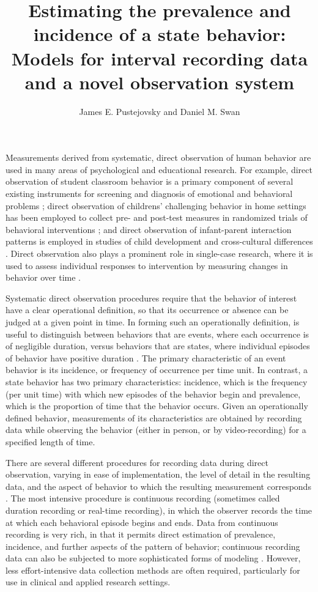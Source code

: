 \documentclass[man, noextraspace, floatsintext]{apa6}\usepackage[]{graphicx}\usepackage[]{color}
\title{Estimating the prevalence and incidence of a state behavior: Models for interval recording data and a novel observation system}
\author{James E. Pustejovsky and Daniel M. Swan}
\affiliation{The University of Texas at Austin}
\begin{document}
\maketitle

Measurements derived from systematic, direct observation of human behavior are used in many areas of psychological and educational research. 
For example, direct observation of student classroom behavior is a primary component of several existing instruments for screening and diagnosis of emotional and behavioral problems \citep{Volpe2005observing}; direct observation of childrens' challenging behavior in home settings has been employed to collect pre- and post-test measures in randomized trials of behavioral interventions \citep[e.g.,][]{Durand2012positive}; and direct observation of infant-parent interaction patterns is employed in studies of child development \citep{Mann1991time} and cross-cultural differences \citep{Bornstein2002measurement}. 
Direct observation also plays a prominent role in single-case research, where it is used to assess individual responses to intervention by measuring changes in behavior over time \citep{Kazdin2011single}.

Systematic direct observation procedures require that the behavior of interest have a clear operational definition, so that its occurrence or absence can be judged at a given point in time. 
In forming such an operationally definition, is useful to distinguish between behaviors that are events, where each occurrence is of negligible duration, versus behaviors that are states, where individual episodes of behavior have positive duration \citep{Altmann1974observational}. 
The primary characteristic of an event behavior is its incidence, or frequency of occurrence per time unit. 
In contrast, a state behavior has two primary characteristics: incidence, which is the frequency (per unit time) with which new episodes of the behavior begin and prevalence, which is the proportion of time that the behavior occurs. Given an operationally defined behavior, measurements of its characteristics are obtained by recording data while observing the behavior (either in person, or by video-recording) for a specified length of time. 

There are several different procedures for recording data during direct observation, varying in ease of implementation, the level of detail in the resulting data, and the aspect of behavior to which the resulting measurement corresponds \citep[for surveys of major recording procedures, see][]{Altmann1974observational, Ayres2010dependent, Hartmann1990observational, Primavera1996measurement}. 
The most intensive procedure is continuous recording (sometimes called duration recording or real-time recording), in which the observer records the time at which each behavioral episode begins and ends.
Data from continuous recording is very rich, in that it permits direct estimation of prevalence, incidence, and further aspects of the pattern of behavior; continuous recording data can also be subjected to more sophisticated forms of modeling \citep[e.g.,][]{Bakeman2011sequential, Haccou1992statistical}. 
However, less effort-intensive data collection methods are often required, particularly for use in clinical and applied research settings. 
\end{document}
